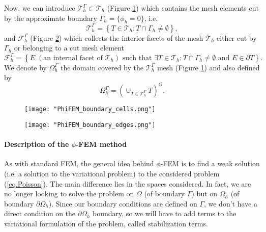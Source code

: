 Now, we can introduce $\mathcal{T}_h^\Gamma\subset \mathcal{T}_h$ (Figure \ref{space4}) which contains the mesh elements cut by the
approximate boundary $\Gamma_h = \{\phi_h=0\}$, i.e. 
\begin{equation*}
	\mathcal{T}_h^\Gamma=\left\{T\in \mathcal{T}_h:T\cap\Gamma_h\ne\emptyset\right\},
\end{equation*}
and $\mathcal{F}_h^\Gamma$ (Figure \ref{space5}) which collects the interior facets of the mesh $\mathcal{T}_h$ either cut by $\Gamma_h$ or belonging to a cut mesh element
\begin{equation*}
	\mathcal{F}_h^\Gamma=\left\{E\;(\text{an internal facet of } \mathcal{T}_h) \text{ such that } \exists T\in \mathcal{T}_h:T\cap\Gamma_h\ne\emptyset \text{ and } E\in\partial T\right\}.
\end{equation*}
We denote by $\Omega_h^\Gamma$ the domain covered by the $\mathcal{T}_h^\Gamma$ mesh (Figure \ref{space4}) and also defined by
\begin{equation*}
	\Omega_h^\Gamma=\left(\cup_{T\in\mathcal{T}_h^\Gamma}T\right)^O.
\end{equation*}

\begin{minipage}{0.48\linewidth}
	\begin{figure}[H]
		\centering
		\texttt{[image: "PhiFEM\_boundary\_cells.png"]}
		\label{space4}
	\end{figure}
\end{minipage} \;
\begin{minipage}{0.48\linewidth}
	\begin{figure}[H]
		\centering
		\texttt{[image: "PhiFEM\_boundary\_edges.png"]}
		\label{space5}
	\end{figure}
\end{minipage}

\paragraph{Description of the $\phi$-FEM method}

As with standard FEM, the general idea behind $\phi$-FEM is to find a weak solution (i.e. a solution to the variational problem) to the considered problem (\ref{eq.Poisson}). The main difference lies in the spaces considered. In fact, we are no longer looking to solve the problem on $\Omega$ (of boundary $\Gamma$) but on $\Omega_h$ (of boundary $\partial\Omega_h$). Since our boundary conditions are defined on $\Gamma$, we don't have a direct condition on the $\partial\Omega_h$ boundary, so we will have to add terms to the variational formulation of the problem, called stabilization terms.


